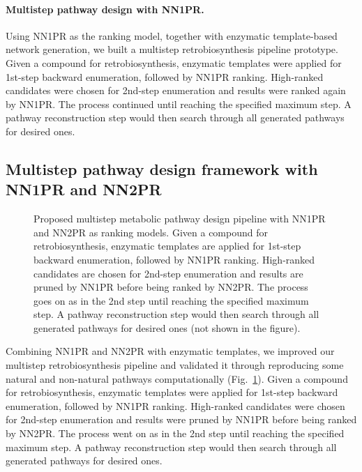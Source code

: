 \documentclass{article}
\begin{document}
\paragraph{Multistep pathway design with NN1PR.}
Using NN1PR as the ranking model, together with enzymatic template-based network generation, we built a multistep retrobiosynthesis pipeline prototype.
Given a compound for retrobiosynthesis, enzymatic templates were applied for 1st-step backward enumeration, followed by NN1PR ranking. High-ranked candidates were chosen for 2nd-step enumeration and results were ranked again by NN1PR. The process continued until reaching the specified maximum step. A pathway reconstruction step would then search through all generated pathways for desired ones.


\subsection{Multistep pathway design framework with NN1PR and NN2PR}
\begin{figure}
\centering
    
    \caption{Proposed multistep metabolic pathway design pipeline with NN1PR and NN2PR as ranking models.
    Given a compound for retrobiosynthesis, enzymatic templates are applied for 1st-step backward enumeration, followed by NN1PR ranking. High-ranked candidates are chosen for 2nd-step enumeration and results are pruned by NN1PR before being ranked by NN2PR. The process goes on as in the 2nd step until reaching the specified maximum step. A pathway
    reconstruction step would then search through all generated pathways for desired ones (not shown in the figure).}
    \label{fig:multistep_pipeline}
\end{figure}
Combining NN1PR and NN2PR with enzymatic templates, we improved our
multistep retrobiosynthesis pipeline and validated it through reproducing some natural and non-natural pathways computationally (Fig.~\ref{fig:multistep_pipeline}).
Given a compound for retrobiosynthesis, enzymatic templates were applied for 1st-step backward enumeration, followed by NN1PR ranking. High-ranked candidates were chosen for 2nd-step enumeration and results were pruned by NN1PR before being ranked by NN2PR. The process went on as in the 2nd step until reaching the specified maximum step. A pathway reconstruction step would then search through all generated pathways for desired ones.
\end{document}
